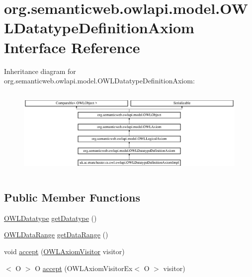 \hypertarget{interfaceorg_1_1semanticweb_1_1owlapi_1_1model_1_1_o_w_l_datatype_definition_axiom}{\section{org.\-semanticweb.\-owlapi.\-model.\-O\-W\-L\-Datatype\-Definition\-Axiom Interface Reference}
\label{interfaceorg_1_1semanticweb_1_1owlapi_1_1model_1_1_o_w_l_datatype_definition_axiom}
}
Inheritance diagram for org.\-semanticweb.\-owlapi.\-model.\-O\-W\-L\-Datatype\-Definition\-Axiom\-:\begin{figure}[H]
\begin{center}
\leavevmode
\includegraphics[height=4.296675cm]{interfaceorg_1_1semanticweb_1_1owlapi_1_1model_1_1_o_w_l_datatype_definition_axiom}
\end{center}
\end{figure}
\subsection*{Public Member Functions}
\begin{DoxyCompactItemize}
\item 
\hyperlink{interfaceorg_1_1semanticweb_1_1owlapi_1_1model_1_1_o_w_l_datatype}{O\-W\-L\-Datatype} \hyperlink{interfaceorg_1_1semanticweb_1_1owlapi_1_1model_1_1_o_w_l_datatype_definition_axiom_a06fb40451004fe34f8737b692dfb25f6}{get\-Datatype} ()
\item 
\hyperlink{interfaceorg_1_1semanticweb_1_1owlapi_1_1model_1_1_o_w_l_data_range}{O\-W\-L\-Data\-Range} \hyperlink{interfaceorg_1_1semanticweb_1_1owlapi_1_1model_1_1_o_w_l_datatype_definition_axiom_a7f174bb066af970a587779ac4f257637}{get\-Data\-Range} ()
\item 
void \hyperlink{interfaceorg_1_1semanticweb_1_1owlapi_1_1model_1_1_o_w_l_datatype_definition_axiom_abbc12af84d7713c253d2b356900f57ee}{accept} (\hyperlink{interfaceorg_1_1semanticweb_1_1owlapi_1_1model_1_1_o_w_l_axiom_visitor}{O\-W\-L\-Axiom\-Visitor} visitor)
\item 
$<$ O $>$ O \hyperlink{interfaceorg_1_1semanticweb_1_1owlapi_1_1model_1_1_o_w_l_datatype_definition_axiom_afaef74c418494908c8091192604669a9}{accept} (O\-W\-L\-Axiom\-Visitor\-Ex$<$ O $>$ visitor)
\end{DoxyCompactItemize}


